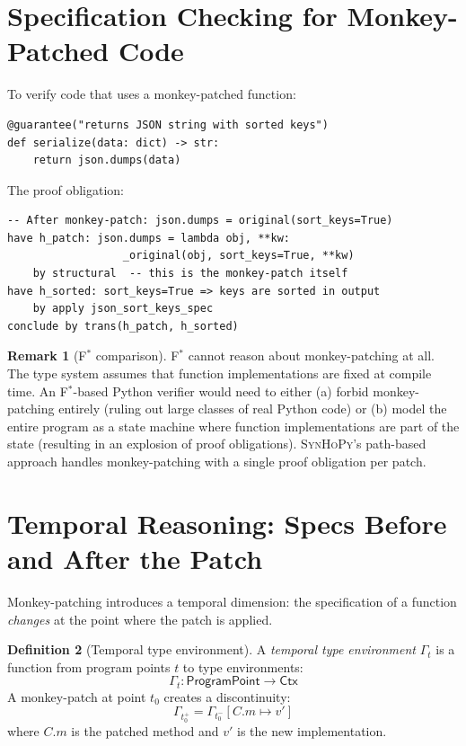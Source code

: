\documentclass[11pt,a4paper]{report}
\theoremstyle{definition}
\newtheorem{definition}{Definition}[chapter]
\newtheorem{remark}[definition]{Remark}
\theoremstyle{plain}
\newcommand{\Ctx}{\mathsf{Ctx}}
\newcommand{\fstar}{F$^{*}$}
\newcommand{\synhopy}{\textsc{SynHoPy}}
\begin{document}
\section{Specification Checking for Monkey-Patched Code}

To verify code that uses a monkey-patched function:

\begin{lstlisting}[style=synhopy]
@guarantee("returns JSON string with sorted keys")
def serialize(data: dict) -> str:
    return json.dumps(data)
\end{lstlisting}

The proof obligation:
\begin{lstlisting}[style=proof]
-- After monkey-patch: json.dumps = original(sort_keys=True)
have h_patch: json.dumps = lambda obj, **kw:
                  _original(obj, sort_keys=True, **kw)
    by structural  -- this is the monkey-patch itself
have h_sorted: sort_keys=True => keys are sorted in output
    by apply json_sort_keys_spec
conclude by trans(h_patch, h_sorted)
\end{lstlisting}

\begin{remark}[\fstar{} comparison]
\fstar{} cannot reason about monkey-patching at all. The type system assumes that
function implementations are fixed at compile time. An \fstar{}-based Python
verifier would need to either (a) forbid monkey-patching entirely (ruling out
large classes of real Python code) or (b) model the entire program as a state
machine where function implementations are part of the state (resulting in an
explosion of proof obligations). \synhopy{}'s path-based approach handles
monkey-patching with a single proof obligation per patch.
\end{remark}


\section{Temporal Reasoning: Specs Before and After the Patch}
\label{sec:temporal-patch}

Monkey-patching introduces a temporal dimension: the specification of a function
\emph{changes} at the point where the patch is applied.

\begin{definition}[Temporal type environment]
A \emph{temporal type environment} $\Gamma_t$ is a function from program points
$t$ to type environments:
\[
  \Gamma_t : \mathsf{ProgramPoint} \to \Ctx
\]
A monkey-patch at point $t_0$ creates a discontinuity:
\[
  \Gamma_{t_0^+} = \Gamma_{t_0^-}[C.m \mapsto v']
\]
where $C.m$ is the patched method and $v'$ is the new implementation.
\end{definition}
\end{document}
